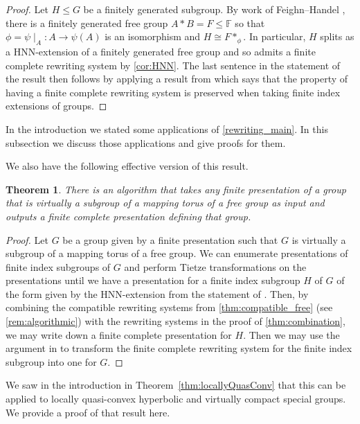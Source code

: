 \documentclass[12pt, a4paper]{amsart}
\newcommand{\F}{\mathbb{F}}
\newtheorem{theorem}{Theorem}[section]
\theoremstyle{definition}
\begin{document}
\MainTheoremB*

\begin{proof}
Let $H\leqslant G$ be a finitely generated subgroup. By work of Feighn--Handel \cite[Proposition 2.3]{Feighn1999}, there is a finitely generated free group $A*B = F\leqslant \F$ so that $\phi = \psi\mid_{A}\colon A\to \psi(A)$ is an isomorphism and $H\cong F*_{\phi}$. In particular, $H$ splits as a HNN-extension of a finitely generated free group and so admits a finite complete rewriting system by \cref{cor:HNN}. The last sentence in the statement of the result then follows by applying a result from \cite{Groves1993} which says that the property of having a finite complete rewriting system is preserved when taking finite index extensions of groups.
\end{proof}

In the introduction we stated some applications of \cref{rewriting_main}. In this subsection we discuss those applications and give proofs for them.

We also have the following effective version of this result.

\begin{theorem}
\label{thm:computingFCRSGeneral} 
There is an algorithm that takes any finite presentation of a group that is virtually a subgroup of a mapping torus of a free group as input and outputs a finite complete presentation defining that group.
\end{theorem}

\begin{proof}
Let $G$ be a group given by a finite presentation such that $G$ is virtually a subgroup of a mapping torus of a free group. We can enumerate presentations of finite index subgroups of $G$ and perform Tietze transformations on the presentations until we have a presentation for a finite index subgroup $H$ of $G$ of the form given by the HNN-extension from the statement of \cite[Proposition 2.3]{Feighn1999}. Then, by combining the compatible rewriting systems from \cref{thm:compatible_free} (see \cref{rem:algorithmic}) with the rewriting systems in the proof of \cref{thm:combination}, we may write down a finite complete presentation for $H$. Then we may use the argument in \cite{Groves1993} to transform the finite complete rewriting system for the finite index subgroup into one for $G$. 
\end{proof}

We saw in the introduction in Theorem~\ref{thm:locallyQuasConv} that this can be applied to locally quasi-convex hyperbolic and virtually compact special groups. We provide a proof of that result here. 
\end{document}
